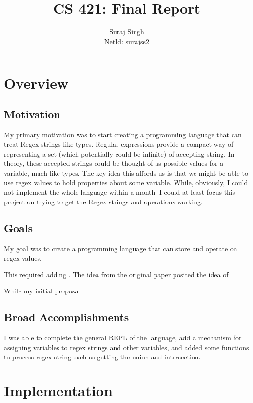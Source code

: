 \documentclass[letterpaper, 11pt]{article}
\title{CS 421: Final Report}
\author{Suraj Singh \\ NetId: surajss2 }
\begin{document}
\maketitle


\section{Overview}\label{sec:overview}
\subsection{Motivation}\label{sec:motivation}
My primary motivation was to start creating a programming language that can treat Regex strings like types.
Regular expressions provide a compact way of representing a set (which potentially could be infinite) of accepting string.
In theory, these accepted strings could be thought of as possible values for a variable, much like types.
The key idea this affords us is that we might be able to use regex values to hold properties about some variable.
While, obviously, I could not implement the whole language within a month, I could at least focus this project on trying to get the Regex strings and operations working.

\subsection{Goals}\label{sec:goals}
My goal was to create a programming language that can store and operate on regex values.

This required adding . 
The idea from the original paper posited the idea of 

While my initial proposal 

\subsection{Broad Accomplishments}\label{sec:accomplications}
I was able to complete the general REPL of the language, add a mechanism for assigning variables to regex strings and other variables, and added some functions to process regex string such as getting the union and intersection. 


\section{Implementation}\label{sec:impl}
\end{document}
